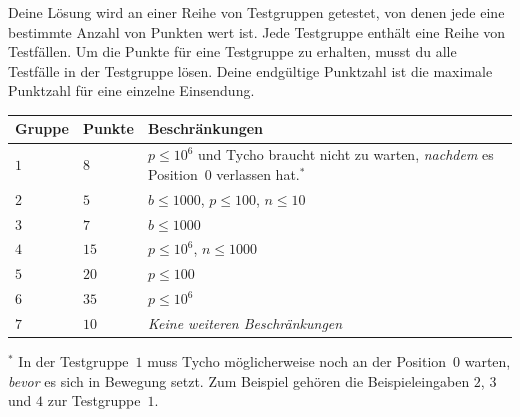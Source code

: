 Deine Lösung wird an einer Reihe von Testgruppen getestet, von denen jede eine bestimmte Anzahl von Punkten wert ist.
Jede Testgruppe enthält eine Reihe von Testfällen.
Um die Punkte für eine Testgruppe zu erhalten, musst du alle Testfälle in der Testgruppe lösen.
Deine endgültige Punktzahl ist die maximale Punktzahl für eine einzelne Einsendung.

\medskip
\begin{tabular}{lll}
Gruppe & Punkte & Beschränkungen \\\hline
  $1$ & $8$  & $p\leq 10^6$ und Tycho braucht nicht zu warten, \emph{nachdem} es Position~$0$ verlassen hat.$^*$ \\ %
  $2$ & $5$  & $b\leq 1000$, $p\leq 100$, $n\leq 10$ \\
  $3$ & $7$  & $b\leq 1000$ \\
  $4$ & $15$ & $p\leq 10^6$, $n\leq 1000$\\
  $5$ & $20$ & $p\leq 100$\\
  $6$ & $35$ & $p\leq 10^6$\\
  $7$ & $10$ & \emph{Keine weiteren Beschränkungen}
\end{tabular}

\medskip
\noindent $^*$ In der Testgruppe~$1$ muss Tycho möglicherweise noch an der Position~$0$ warten, \emph{bevor} es sich in Bewegung setzt.
Zum Beispiel gehören die Beispieleingaben $2$, $3$ und $4$ zur Testgruppe~$1$.
